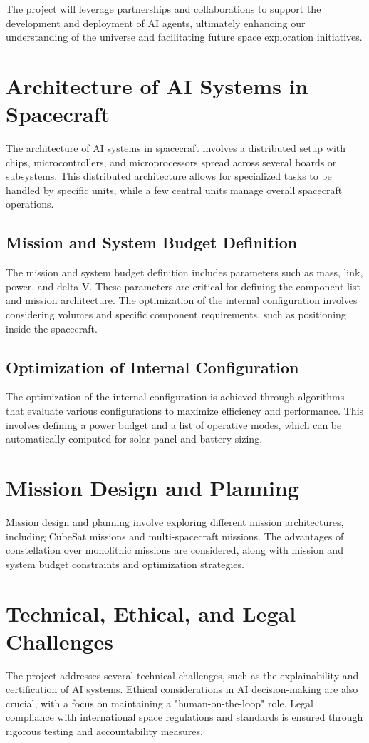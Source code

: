\documentclass[12pt]{article}
\begin{document}
The project will leverage partnerships and collaborations to support the development and deployment of AI agents, ultimately enhancing our understanding of the universe and facilitating future space exploration initiatives.

\section{Architecture of AI Systems in Spacecraft}
The architecture of AI systems in spacecraft involves a distributed setup with chips, microcontrollers, and microprocessors spread across several boards or subsystems. This distributed architecture allows for specialized tasks to be handled by specific units, while a few central units manage overall spacecraft operations.

\subsection{Mission and System Budget Definition}
The mission and system budget definition includes parameters such as mass, link, power, and delta-V. These parameters are critical for defining the component list and mission architecture. The optimization of the internal configuration involves considering volumes and specific component requirements, such as positioning inside the spacecraft.

\subsection{Optimization of Internal Configuration}
The optimization of the internal configuration is achieved through algorithms that evaluate various configurations to maximize efficiency and performance. This involves defining a power budget and a list of operative modes, which can be automatically computed for solar panel and battery sizing.

\section{Mission Design and Planning}
Mission design and planning involve exploring different mission architectures, including CubeSat missions and multi-spacecraft missions. The advantages of constellation over monolithic missions are considered, along with mission and system budget constraints and optimization strategies.

\section{Technical, Ethical, and Legal Challenges}
The project addresses several technical challenges, such as the explainability and certification of AI systems. Ethical considerations in AI decision-making are also crucial, with a focus on maintaining a "human-on-the-loop" role. Legal compliance with international space regulations and standards is ensured through rigorous testing and accountability measures.
\end{document}
